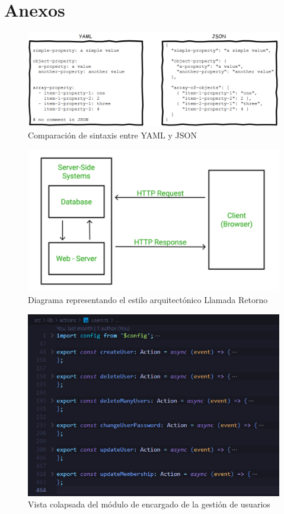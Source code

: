 \section{Anexos}
\begin{figure}[H]
    \centering
    \includegraphics[width=\linewidth]{images/yaml-vs-json.png}
    \caption{Comparación de sintaxis entre YAML y JSON}
    \label{fig:yaml-vs-json}
\end{figure}

\begin{figure}[H]
    \centering
    \includegraphics[width=\linewidth]{images/call-return-style.png}
    \caption{Diagrama representando el estilo arquitectónico Llamada Retorno}
    \label{fig:call-return-style}
\end{figure}

\begin{figure}[H]
    \centering
    \includegraphics[scale=0.8]{images/code/collapsed-view-of-user-module.png}
    \caption{Vista colapsada del módulo de encargado de la gestión de usuarios}
    \label{fig:collapsed-view-of-user-module}
\end{figure}

